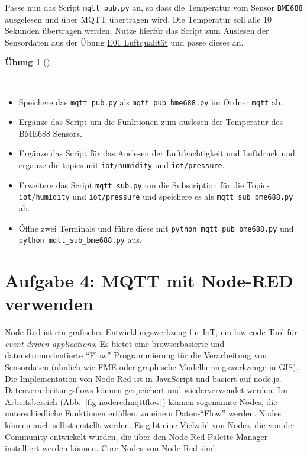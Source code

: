 \documentclass[
  11pt,
  a4paperpaper,
  oneside, openany  ,captions=tableheading
]{scrbook}
\providecommand{\tightlist}{%
  \setlength{\itemsep}{0pt}\setlength{\parskip}{0pt}}
\theoremstyle{definition}
\newtheorem{exercise}{Übung}[chapter]
\theoremstyle{remark}
\begin{document}
Passe nun das Script \texttt{mqtt\_pub.py} an, so dass die Temperatur
vom Sensor \texttt{BME688} ausgelesen und über MQTT übertragen wird. Die
Temperatur soll alle 10 Sekunden übertragen werden. Nutze hierfür das
Script zum Auslesen der Sensordaten aus der Übung
\href{E01_Luftqualitaet.qmd}{E01 Luftqualität} und passe dieses an.

\begin{exercise}[]\protect\hypertarget{exr-mqtt-bme688}{}\label{exr-mqtt-bme688}

~

\begin{itemize}
\tightlist
\item
  Speichere das \texttt{mqtt\_pub.py} als \texttt{mqtt\_pub\_bme688.py}
  im Ordner \texttt{mqtt} ab.
\item
  Ergänze das Script um die Funktionen zum auslesen der Temperatur des
  BME688 Sensors.
\item
  Ergänze das Script für das Auslesen der Luftfeuchtigkeit und Luftdruck
  und ergänze die topics mit \texttt{iot/humidity} und
  \texttt{iot/pressure}.
\item
  Erweitere das Script \texttt{mqtt\_sub.py} um die Subscription für die
  Topics \texttt{iot/humidity} und \texttt{iot/pressure} und speichere
  es als \texttt{mqtt\_sub\_bme688.py} ab.
\item
  Öffne zwei Terminals und führe diese mit
  \texttt{python\ mqtt\_pub\_bme688.py} und
  \texttt{python\ mqtt\_sub\_bme688.py} aus.
\end{itemize}

\end{exercise}

\section{Aufgabe 4: MQTT mit Node-RED
verwenden}\label{aufgabe-4-mqtt-mit-node-red-verwenden}

Node-Red ist ein grafisches Entwicklungswerkzeug für
IoT, ein low-code Tool für \emph{event-driven applications}. Es bietet
eine browserbasierte und datenstromorientierte ``Flow'' Programmierung
für die Verarbeitung von Sensordaten (ähnlich wie FME oder graphische
Modellierungswerkzeuge in GIS). Die Implementation von Node-Red ist in
JavaScript und basiert auf node.js. Datenverarbeitungsflows können
gespeichert und wiederverwendet werden. Im Arbeitsbereich
(Abb.~\ref{fig-noderedmqttflow}) können sogenannte Nodes, die
unterschiedliche Funktionen erfüllen, zu einem Daten-``Flow'' werden.
Nodes können auch selbst erstellt werden. Es gibt eine Vielzahl von
Nodes, die von der Community entwickelt wurden, die über den Node-Red
Palette Manager installiert werden können. Core Nodes von Node-Red sind:
\end{document}
